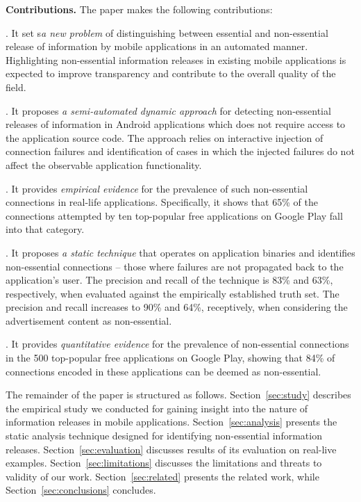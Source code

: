 \vspace{0.1in}
\noindent 
{\bf Contributions.}
The paper makes the following contributions:

.
It set s\emph{a new problem} of distinguishing between essential and non-essential release of information by mobile applications in an automated manner. 
Highlighting non-essential information releases in existing mobile applications is expected to improve transparency and contribute to the overall quality of the field. 

.
It proposes \emph{a semi-automated dynamic approach} for detecting non-essential releases of information in Android applications which does not require access to the application source code. 
The approach relies on interactive injection of connection failures and identification of cases in which the injected failures do not affect the observable application functionality. 

.
It provides \emph{empirical evidence} for the prevalence of such non-essential connections in real-life applications. Specifically, it shows that 65\% of the connections attempted by ten top-popular free applications on Google Play fall into that category.    

.
It proposes \emph{a static technique} that operates on application binaries and identifies non-essential connections -- those where failures are not propagated back to the application's user. The precision and recall of the technique is 83\% and 63\%, respectively, when evaluated against the empirically established truth set. 
The precision and recall increases to 90\% and 64\%, receptively, when considering the advertisement content as non-essential.

.
It provides \emph{quantitative evidence} for the prevalence of non-essential connections in the 500 top-popular free applications on Google Play, showing that 84\% of connections encoded in these applications can be deemed as non-essential.

The remainder of the paper is structured as follows. Section~\ref{sec:study} describes the empirical study we conducted for gaining insight into the nature of information releases in mobile applications. Section~\ref{sec:analysis} presents the static analysis technique designed for identifying non-essential information releases. 
Section~\ref{sec:evaluation} discusses results of its evaluation on real-live examples. Section~\ref{sec:limitations} discusses the limitations and threats to validity of our work. Section~\ref{sec:related} presents the related work, while Section~\ref{sec:conclusions} concludes. 



